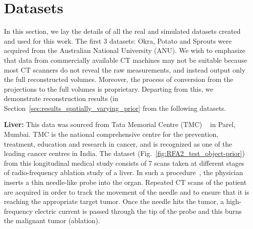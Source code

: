 \documentclass[journal]{IEEEtran}
\begin{document}
\section{Datasets}
\label{sec:datasets}
In this section, we lay the details of all the real and simulated
datasets created and used for this work. The first 3 datasets: Okra,
Potato and Sprouts were acquired from the Australian National
University (ANU). We wish to emphasize that data from commercially
available CT machines may not be suitable because most CT scanners do
not reveal the raw measurements, and instead output only the full
reconstructed volumes. Moreover, the process of conversion from the
projections to the full volumes is proprietary. Departing from this,
we demonstrate reconstruction results (in
Section~\ref{sec:results_spatially_varying_prior} from the following
datasets.

 \textbf{Liver:} %
This data was sourced from Tata Memorial Centre (TMC) ~\cite{tmh} in Parel,
Mumbai.  TMC is the national comprehensive centre for the prevention,
treatment, education and research in cancer, and is recognized as one
of the leading cancer centres in India. The dataset
(Fig.~\ref{fig:RFA2_test_object-prior}) from this longitudinal medical
study consists of 7 scans taken at different stages of radio-frequency
ablation study of a liver. In such a procedure~\cite{Dong2015}, the
physician inserts a thin needle-like probe into the organ. Repeated CT
scans of the patient are acquired in order to track the movement of
the needle and to ensure that it is reaching the appropriate target
tumor. Once the needle hits the tumor, a high-frequency electric
current is passed through the tip of the probe and this burns the
malignant tumor (ablation). 
\end{document}
